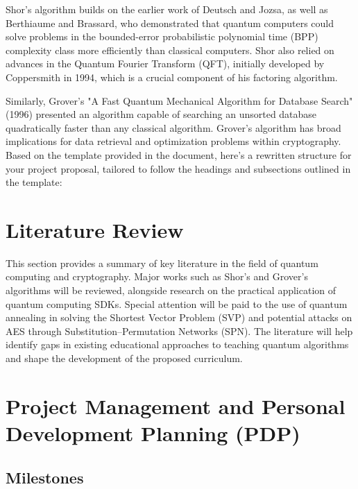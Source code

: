 \documentclass[11pt,a4paper]{article}
\begin{document}
Shor’s algorithm builds on the earlier work of \citeauthor{Deutsch:1992} Deutsch and Jozsa, as well as Berthiaume and Brassard, who demonstrated that quantum computers could solve problems in the bounded-error probabilistic polynomial time (BPP) complexity class more efficiently than classical computers.
Shor also relied on advances in the Quantum Fourier Transform (QFT), initially developed by \citeauthor{Coppersmith:1994} Coppersmith in 1994, which is a crucial component of his factoring algorithm.

Similarly, Grover’s \cite{Grover:1996}  "A Fast Quantum Mechanical Algorithm for Database Search" (1996) presented an algorithm capable of searching an unsorted database quadratically faster than any classical algorithm.
Grover's algorithm has broad implications for data retrieval and optimization problems within cryptography.
Based on the template provided in the document, here’s a rewritten structure for your project proposal, tailored to follow the headings and subsections outlined in the template:


\section{Literature Review}

This section provides a summary of key literature in the field of quantum computing and cryptography.
Major works such as Shor’s and Grover’s algorithms will be reviewed, alongside research on the practical application of quantum computing SDKs.
Special attention will be paid to the use of quantum annealing in solving the Shortest Vector Problem (SVP) and potential attacks on AES through Substitution–Permutation Networks (SPN).
The literature will help identify gaps in existing educational approaches to teaching quantum algorithms and shape the development of the proposed curriculum.

\section{Project Management and Personal Development Planning (PDP)}

\subsection{Milestones}

\begin{itemize}

\end{itemize}
\end{document}
